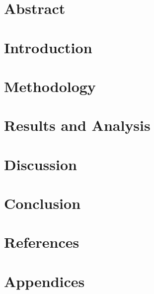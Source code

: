 \documentclass[a4paper, 12pt]{report}
\author{}
\date{}
\begin{document}

\tableofcontents

\chapter{Abstract}


\chapter{Introduction}

   
\chapter{Methodology}


\chapter{Results and Analysis}

   
\chapter{Discussion}

   
\chapter{Conclusion}

 
\chapter{References}


\chapter{Appendices}

\end{document}
